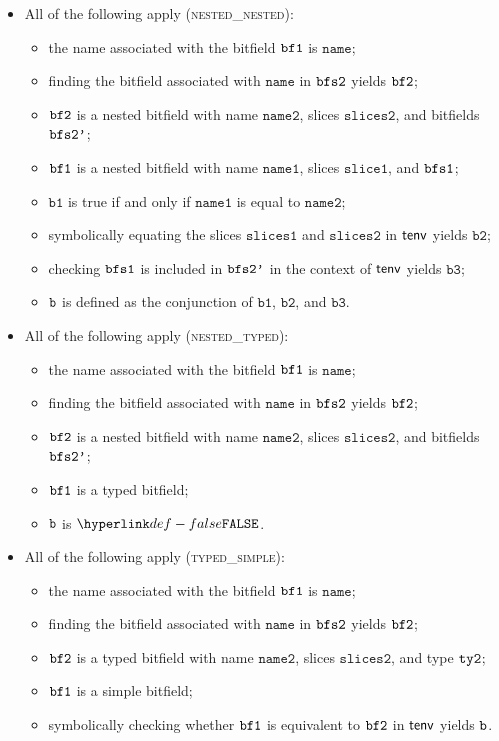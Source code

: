 \documentclass{book}
\newcommand\vbone[0]{\texttt{b1}}
\newcommand\vbtwo[0]{\texttt{b2}}
\newcommand\vbthree[0]{\texttt{b3}}
\newcommand\nameone[0]{\texttt{name1}}
\newcommand\nametwo[0]{\texttt{name2}}
\newcommand\sliceone[0]{\texttt{slice1}}
\newcommand\slicesone[0]{\texttt{slices1}}
\newcommand\slicestwo[0]{\texttt{slices2}}
\newcommand\name[0]{\texttt{name}}
\begin{document}
\begin{itemize}
  \item All of the following apply (\textsc{nested\_nested}):
  \begin{itemize}
    \item the name associated with the bitfield $\texttt{bf1}$ is $\name$;
    \item finding the bitfield associated with $\name$ in $\texttt{bfs2}$ yields $\texttt{bf2}$;
    \item $\texttt{bf2}$ is a nested bitfield with name $\nametwo$, slices $\slicestwo$, and bitfields $\texttt{bfs2'}$;
    \item $\texttt{bf1}$ is a nested bitfield with name $\nameone$, slices $\sliceone$, and $\texttt{bfs1}$;
    \item $\vbone$ is true if and only if $\nameone$ is equal to $\nametwo$;
    \item symbolically equating the slices $\slicesone$ and $\slicestwo$ in $\textsf{tenv}$ yields $\vbtwo$;
    \item checking $\texttt{bfs1}$ is included in $\texttt{bfs2'}$ in the context of $\textsf{tenv}$ yields $\vbthree$;
    \item $\texttt{b}$ is defined as the conjunction of $\vbone$, $\vbtwo$, and $\vbthree$.
  \end{itemize}

  \item All of the following apply (\textsc{nested\_typed}):
  \begin{itemize}
    \item the name associated with the bitfield $\texttt{bf1}$ is $\name$;
    \item finding the bitfield associated with $\name$ in $\texttt{bfs2}$ yields $\texttt{bf2}$;
    \item $\texttt{bf2}$ is a nested bitfield with name $\nametwo$, slices $\slicestwo$, and bitfields $\texttt{bfs2'}$;
    \item $\texttt{bf1}$ is a typed bitfield;
    \item $\texttt{b}$ is $\False$.
  \end{itemize}

  \item All of the following apply (\textsc{typed\_simple}):
  \begin{itemize}
    \item the name associated with the bitfield $\texttt{bf1}$ is $\name$;
    \item finding the bitfield associated with $\name$ in $\texttt{bfs2}$ yields $\texttt{bf2}$;
    \item $\texttt{bf2}$ is a typed bitfield with name $\nametwo$, slices $\slicestwo$, and type $\texttt{ty2}$;
    \item $\texttt{bf1}$ is a simple bitfield;
    \item symbolically checking whether $\texttt{bf1}$ is equivalent to $\texttt{bf2}$ in $\textsf{tenv}$ yields $\texttt{b}$.
  \end{itemize}


\end{itemize}
\end{document}
